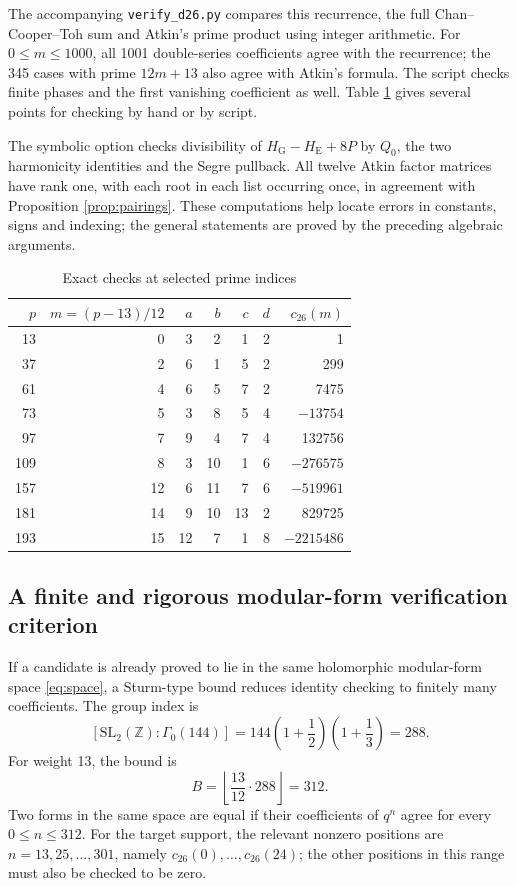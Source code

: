 \documentclass[a4paper,11pt]{article}
\theoremstyle{definition}
\newcommand{\Z}{\mathbb Z}
\begin{document}
The accompanying \texttt{verify\_d26.py} compares this recurrence,
the full Chan--Cooper--Toh sum and Atkin's prime product using integer arithmetic.
For \(0\leq m\leq1000\), all 1001 double-series coefficients agree with the recurrence;
the 345 cases with prime \(12m+13\) also agree with Atkin's formula.
The script checks finite phases and the first vanishing coefficient as well.
Table \ref{tab:samples} gives several points for checking by hand or by script.

The symbolic option checks divisibility of \(H_{\mathrm G}-H_{\mathrm E}+8P\)
by \(Q_0\), the two harmonicity identities and the Segre pullback.
All twelve Atkin factor matrices have rank one, with each root in each list
occurring once, in agreement with Proposition \ref{prop:pairings}.
These computations help locate errors in constants, signs and indexing;
the general statements are proved by the preceding algebraic arguments.
\begin{table}[H]
\centering
\caption{Exact checks at selected prime indices}\label{tab:samples}
\begin{tabular}{rrrrrrr}
\toprule
\(p\) & \(m=(p-13)/12\) & \(a\) & \(b\) & \(c\) & \(d\) & \(c_{26}(m)\)\\
\midrule
13  & 0  & 3 & 2  & 1  & 2 & 1\\
37  & 2  & 6 & 1  & 5  & 2 & 299\\
61  & 4  & 6 & 5  & 7  & 2 & 7475\\
73  & 5  & 3 & 8  & 5  & 4 & \(-13754\)\\
97  & 7  & 9 & 4  & 7  & 4 & 132756\\
109 & 8  & 3 & 10 & 1  & 6 & \(-276575\)\\
157 & 12 & 6 & 11 & 7  & 6 & \(-519961\)\\
181 & 14 & 9 & 10 & 13 & 2 & 829725\\
193 & 15 & 12 & 7 & 1  & 8 & \(-2215486\)\\
\bottomrule
\end{tabular}
\end{table}

\subsection{A finite and rigorous modular-form verification criterion}
If a candidate is already proved to lie in the same holomorphic
modular-form space \eqref{eq:space}, a Sturm-type bound reduces
identity checking to finitely many coefficients.
The group index is
\begin{equation}\label{eq:indexgroup}
 [\mathrm{SL}_2(\Z):\Gamma_0(144)]
 =144\left(1+\frac12\right)\left(1+\frac13\right)=288.
\end{equation}
For weight 13, the bound is
\begin{equation}\label{eq:Sturm}
 B=\left\lfloor\frac{13}{12}\cdot288\right\rfloor=312.
\end{equation}
Two forms in the same space are equal if their coefficients of
\(q^n\) agree for every \(0\leq n\leq312\).
For the target support, the relevant nonzero positions are
\(n=13,25,\ldots,301\), namely \(c_{26}(0),\ldots,c_{26}(24)\);
the other positions in this range must also be checked to be zero.
\end{document}
